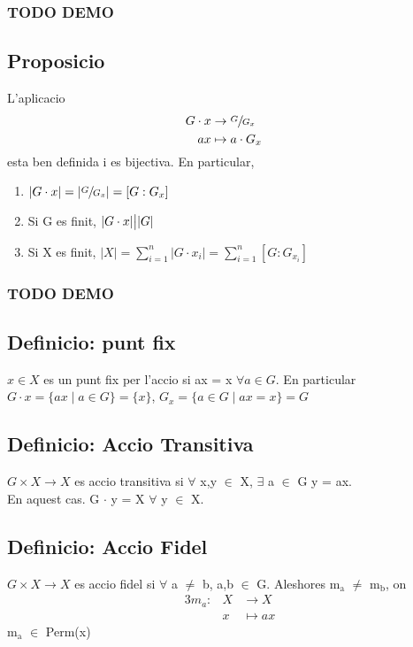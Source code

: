\documentclass[11pt]{article}
\begin{document}
\subsubsection{{\bfseries\sffamily TODO} DEMO}
\label{sec:orga446ca3}

\subsection{Proposicio}
\label{sec:orgf78906f}
L'aplicacio
\begin{alignat*}{3}
G \cdot x &\to \sfrac{G}{G_x}& \\
ax &\mapsto a\cdot G_x&
\end{alignat*}
esta ben definida i es bijectiva. En particular, \\
\begin{enumerate}
\item \(\lvert G \cdot x \rvert = \lvert \sfrac{G}{G_x} \rvert = [G:G_x]\)
\item Si G es finit, \(\lvert G \cdot x \rvert \big{|} \lvert G \rvert\)
\item Si X es finit, \(\lvert X \rvert = \sum_{i=1}^{n} \lvert G \cdot x_i \rvert = \sum_{i=1}^n [G:G_{x_i}]\)
\end{enumerate}
\subsubsection{{\bfseries\sffamily TODO} DEMO}
\label{sec:org4bd6d51}

\subsection{Definicio: punt fix}
\label{sec:orgeb2b6a7}
\(x \in X\) es un punt fix per l'accio si ax = x \(\forall a \in G\). En particular\\
\(G \cdot x = \{ax \mid a \in G\} = \{x\}\), \(G_x = \{ a \in G \mid ax = x \} = G\)

\subsection{Definicio: Accio Transitiva}
\label{sec:org7c9e6ee}
\(G \times X \to X\) es accio transitiva si \(\forall\) x,y \(\in\) X, \(\exists\) a \(\in\) G  y = ax. \\
En aquest cas. G \(\cdot\) y = X \(\forall\) \quad y \(\in\) X.

\subsection{Definicio: Accio Fidel}
\label{sec:orgf8941a0}
\(G \times X \to X\) es accio fidel si \(\forall\) a \(\neq\) b, a,b \(\in\) G. Aleshores m\(_{\text{a}}\) \(\neq\) m\(_{\text{b}}\), on
\begin{alignat*}{3}
m_a: &X &\to X \\
&x &\mapsto ax
\end{alignat*}
m\(_{\text{a}}\) \(\in\) Perm(x)
\end{document}
